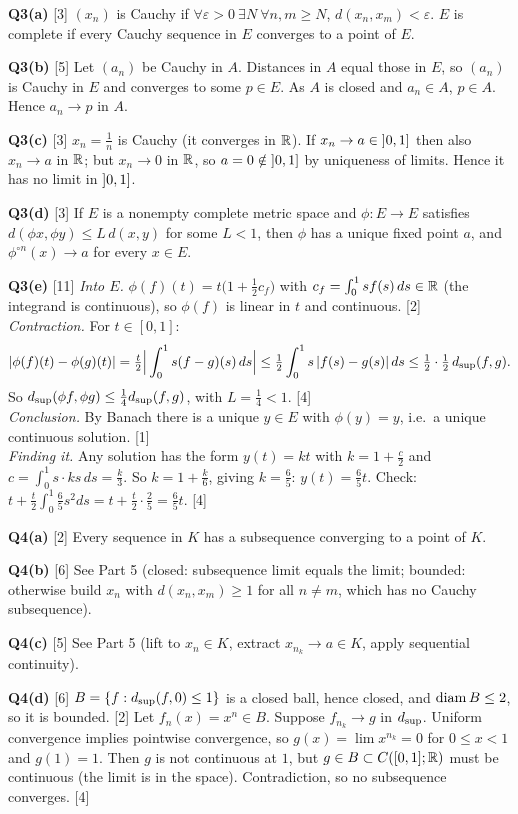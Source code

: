 \textbf{Q3(a)} [3] $(x_n)$ is Cauchy if $\forall\varepsilon>0\ \exists N\ \forall n,m\ge N$,
$d(x_n,x_m)<\varepsilon$. $E$ is complete if every Cauchy sequence in $E$ converges to a point of
$E$.

\textbf{Q3(b)} [5] Let $(a_n)$ be Cauchy in $A$. Distances in $A$ equal those in $E$, so
$(a_n)$ is Cauchy in $E$ and converges to some $p\in E$. As $A$ is closed and $a_n\in A$,
$p\in A$. Hence $a_n\to p$ in $A$.

\textbf{Q3(c)} [3] $x_n=\frac1n$ is Cauchy (it converges in $\mathbb R$). If $x_n\to a\in\mathopen{]}0,1\mathclose{]}$ then also
$x_n\to a$ in $\mathbb R$; but $x_n\to0$ in $\mathbb R$, so $a=0\notin\mathopen{]}0,1\mathclose{]}$ by uniqueness of limits. Hence it
has no limit in $\mathopen{]}0,1\mathclose{]}$.

\textbf{Q3(d)} [3] If $E$ is a nonempty complete metric space and $\phi:E\to E$ satisfies
$d(\phi x,\phi y)\le L\,d(x,y)$ for some $L<1$, then $\phi$ has a unique fixed point $a$, and
$\phi^{\circ n}(x)\to a$ for every $x\in E$.

\textbf{Q3(e)} [11] \emph{Into $E$.} $\phi(f)(t)=t\big(1+\frac12c_f\big)$ with
$c_f=\int_0^1sf(s)\,ds\in\mathbb R$ (the integrand is continuous), so $\phi(f)$ is linear in $t$ and
continuous. [2]\\
\emph{Contraction.} For $t\in[0,1]$:
\[|\phi(f)(t)-\phi(g)(t)|=\tfrac t2\Big|\int_0^1s(f-g)(s)\,ds\Big|\le\tfrac12\int_0^1s\,|f(s)-g(s)|\,ds
\le\tfrac12\cdot\tfrac12\,d_{\sup}(f,g).\]
So $d_{\sup}(\phi f,\phi g)\le\frac14d_{\sup}(f,g)$, with $L=\frac14<1$. [4]\\
\emph{Conclusion.} By Banach there is a unique $y\in E$ with $\phi(y)=y$, i.e.\ a unique
continuous solution. [1]\\
\emph{Finding it.} Any solution has the form $y(t)=kt$ with $k=1+\frac c2$ and
$c=\int_0^1s\cdot ks\,ds=\frac k3$. So $k=1+\frac k6$, giving $k=\frac65$: $y(t)=\frac65t$.
Check: $t+\frac t2\int_0^1\frac65s^2ds=t+\frac t2\cdot\frac25=\frac65t$. [4]

\textbf{Q4(a)} [2] Every sequence in $K$ has a subsequence converging to a point of $K$.

\textbf{Q4(b)} [6] See Part 5 (closed: subsequence limit equals the limit; bounded: otherwise
build $x_n$ with $d(x_n,x_m)\ge1$ for all $n\ne m$, which has no Cauchy subsequence).

\textbf{Q4(c)} [5] See Part 5 (lift to $x_n\in K$, extract $x_{n_k}\to a\in K$, apply
sequential continuity).

\textbf{Q4(d)} [6] $B=\{f:d_{\sup}(f,0)\le1\}$ is a closed ball, hence closed, and
$\operatorname{diam} B\le2$, so it is bounded. [2] Let $f_n(x)=x^n\in B$. Suppose $f_{n_k}\to g$ in $d_{\sup}$.
Uniform convergence implies pointwise convergence, so $g(x)=\lim x^{n_k}=0$ for $0\le x<1$ and
$g(1)=1$. Then $g$ is not continuous at $1$, but $g\in B\subset C([0,1];\mathbb R)$ must be continuous
(the limit is in the space). Contradiction, so no subsequence converges. [4]

